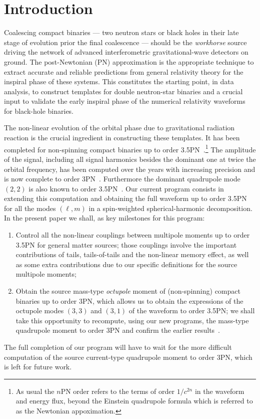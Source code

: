 \documentclass[prd,preprint,superscriptaddress,tightenlines,nofootinbib,
  eqsecnum,showpacs]{revtex4}
\begin{document}
\section{Introduction} \label{sec:intro}

Coalescing compact binaries --- two neutron stars or black holes in
their late stage of evolution prior the final coalescence --- should
be the \textit{workhorse} source driving the network of advanced
interferometric gravitational-wave detectors on ground. The
post-Newtonian (PN) approximation is the appropriate technique to
extract accurate and reliable predictions from general relativity
theory for the inspiral phase of these systems. This constitutes the
starting point, in data analysis, to construct templates for double
neutron-star binaries and a crucial input to validate the early
inspiral phase of the numerical relativity waveforms for black-hole
binaries.

The non-linear evolution of the orbital phase due to gravitational
radiation reaction is the crucial ingredient in constructing these
templates. It has been completed for non-spinning compact binaries up
to order 3.5PN~\cite{BDIWW95, B98tail, BIJ02, BFIJ02, BI04mult,
  BDEI04, BDEI05dr}.\footnote{As usual the $n$PN order refers to the
  terms of order $1/c^{2n}$ in the waveform and energy flux, beyond
  the Einstein quadrupole formula which is referred to as the Newtonian
  appoximation.} The amplitude of the signal, including all signal
harmonics besides the dominant one at twice the orbital frequency, has
been computed over the years with increasing precision and is now
complete to order 3PN~\cite{BIWW96, ABIQ04, KBI07, K07,
  BFIS08}. Furthermore the dominant quadrupole mode $(2,2)$ is also
known to order 3.5PN~\cite{FMBI12}. Our current program consists in
extending this computation and obtaining the full waveform up to order
3.5PN for all the modes $(\ell, m)$ in a spin-weighted
spherical-harmonic decomposition. In the present paper we shall, as
key milestones for this program:
%
\begin{enumerate}

\item Control all the non-linear couplings between multipole moments up to
  order 3.5PN for general matter sources; those couplings involve the
  important contributions of tails, tails-of-tails and the non-linear memory
  effect, as well as some extra contributions due to our specific definitions
  for the source multipole moments;

\item Obtain the source mass-type \textit{octupole} moment of (non-spinning)
  compact binaries up to order 3PN, which allows us to obtain the expressions
  of the octupole modes $(3,3)$ and $(3,1)$ of the waveform to order 3.5PN; we
  shall take this opportunity to recompute, using our new programs, the
  mass-type quadrupole moment to order 3PN and confirm the earlier
  results~\cite{BI04mult, BDEI04, BDEI05dr}.
\end{enumerate}
%
The full completion of our program will have to wait for the more difficult
computation of the source current-type quadrupole moment to order 3PN, which
is left for future work.
\end{document}
